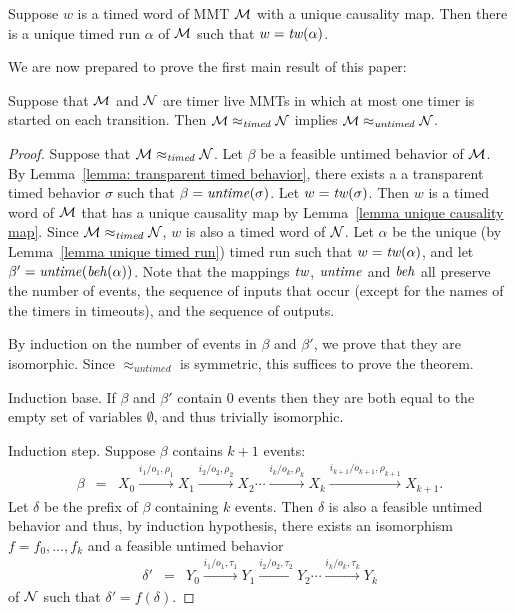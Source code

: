 \begin{lemma}
\label{lemma unique timed run}
Suppose $w$ is a timed word of MMT ${\cal M}$ with a unique causality map.
Then there is a unique timed run $\alpha$ of ${\cal M}$ such that $w = \mathit{tw}(\alpha)$.
\end{lemma}

We are now prepared to prove the first main result of this paper:

\begin{theorem}
\label{timedimpliesuntimed}
Suppose that ${\cal M}$ and ${\cal N}$ are timer live MMTs in which at most one timer is started on each transition. Then
${\cal M} \approx_{\mathit{timed}} {\cal N}$
implies
${\cal M} \approx_{\mathit{untimed}} {\cal N}$.
\end{theorem}
\begin{proof}
Suppose that ${\cal M} \approx_{\mathit{timed}} {\cal N}$.
Let $\beta$ be a feasible untimed behavior of ${\cal M}$.
By Lemma~\ref{lemma: transparent timed behavior}, there exists a 
a transparent timed behavior $\sigma$ such that $\beta = \mathit{untime}(\sigma)$.
Let  $w = \mathit{tw}(\sigma)$.
Then $w$ is a timed word of ${\cal M}$ that has a unique causality map by Lemma~\ref{lemma unique causality map}.
Since ${\cal M} \approx_{\mathit{timed}} {\cal N}$, $w$ is also a timed word of ${\cal N}$.
Let $\alpha$ be the unique (by Lemma~\ref{lemma unique timed run}) timed run such that $w = \mathit{tw}(\alpha)$,
and let $\beta' = \mathit{untime}(\mathit{beh}(\alpha))$.
Note that the mappings $\mathit{tw}$, $\mathit{untime}$ and $\mathit{beh}$ all preserve the number of events, the sequence of inputs that occur (except for the names of the timers in timeouts), and the sequence of outputs.

By induction on the number of events in $\beta$ and $\beta'$, we prove that they are isomorphic.
Since $\approx_{\mathit{untimed}}$ is symmetric, this suffices to prove the theorem.

Induction base. If $\beta$ and $\beta'$ contain $0$ events then they are both equal to the empty set of variables $\emptyset$,
and thus trivially isomorphic.

Induction step. Suppose $\beta$ contains $k+1$ events:
\begin{eqnarray*}
\beta & = & X_0 \xrightarrow{i_1/o_1, \rho_1} X_1  \xrightarrow{i_2/o_2, \rho_2} X_2 \cdots \xrightarrow{i_k/o_k, \rho_k} X_{k}
 \xrightarrow{i_{k+1}/o_{k+1}, \rho_{k+1}} X_{k+1}.
\end{eqnarray*}
Let $\delta$ be the prefix of $\beta$ containing $k$ events. Then $\delta$ is also a feasible untimed behavior and thus, by
induction hypothesis, there exists an isomorphism $f = f_0 ,\ldots, f_k$ and a feasible untimed behavior
\begin{eqnarray*}
\delta' & = & Y_0 \xrightarrow{i_1/o_1, \tau_1} Y_1  \xrightarrow{i_2/o_2, \tau_2} Y_2 \cdots \xrightarrow{i_k/o_k, \tau_k} Y_{k}
\end{eqnarray*}
of ${\cal N}$ such that $\delta' = f(\delta)$.
\end{proof}

